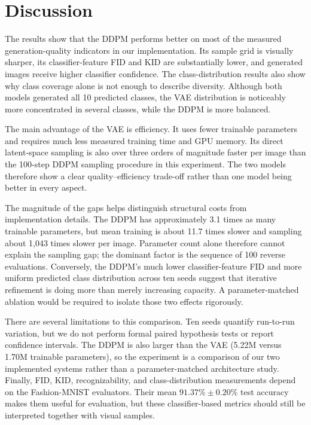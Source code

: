 \documentclass{article}
\begin{document}
\section{Discussion}
The results show that the DDPM performs better on most of the measured generation-quality indicators in our implementation. Its sample grid is visually sharper, its classifier-feature FID and KID are substantially lower, and generated images receive higher classifier confidence. The class-distribution results also show why class coverage alone is not enough to describe diversity. Although both models generated all 10 predicted classes, the VAE distribution is noticeably more concentrated in several classes, while the DDPM is more balanced.

The main advantage of the VAE is efficiency. It uses fewer trainable parameters and requires much less measured training time and GPU memory. Its direct latent-space sampling is also over three orders of magnitude faster per image than the 100-step DDPM sampling procedure in this experiment. The two models therefore show a clear quality--efficiency trade-off rather than one model being better in every aspect.

The magnitude of the gaps helps distinguish structural costs from implementation details. The DDPM has approximately 3.1 times as many trainable parameters, but mean training is about 11.7 times slower and sampling about 1,043 times slower per image. Parameter count alone therefore cannot explain the sampling gap; the dominant factor is the sequence of 100 reverse evaluations. Conversely, the DDPM's much lower classifier-feature FID and more uniform predicted class distribution across ten seeds suggest that iterative refinement is doing more than merely increasing capacity. A parameter-matched ablation would be required to isolate those two effects rigorously.

There are several limitations to this comparison. Ten seeds quantify run-to-run variation, but we do not perform formal paired hypothesis tests or report confidence intervals. The DDPM is also larger than the VAE (5.22M versus 1.70M trainable parameters), so the experiment is a comparison of our two implemented systems rather than a parameter-matched architecture study. Finally, FID, KID, recognizability, and class-distribution measurements depend on the Fashion-MNIST evaluators. Their mean $91.37\% \pm 0.20\%$ test accuracy makes them useful for evaluation, but these classifier-based metrics should still be interpreted together with visual samples.
\end{document}
